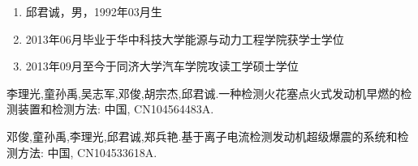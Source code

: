\begin{resume}
  \begin{enumerate}[ ]
  \item 邱君诚，男，1992年03月生\par
  \item 2013年06月毕业于华中科技大学能源与动力工程学院获学士学位\par
  \item 2013年09月至今于同济大学汽车学院攻读工学硕士学位
  \end{enumerate}
  
  \begin{enumerate}[{[}1{]}]
  \item 李理光,童孙禹,吴志军,邓俊,胡宗杰,邱君诚.一种检测火花塞点火式发动机早燃的检测装置和检测方法: 中国, CN104564483A.
  \item 邓俊,童孙禹,李理光,邱君诚,郑兵艳.基于离子电流检测发动机超级爆震的系统和检测方法: 中国, CN104533618A.
  \end{enumerate}
\end{resume}

